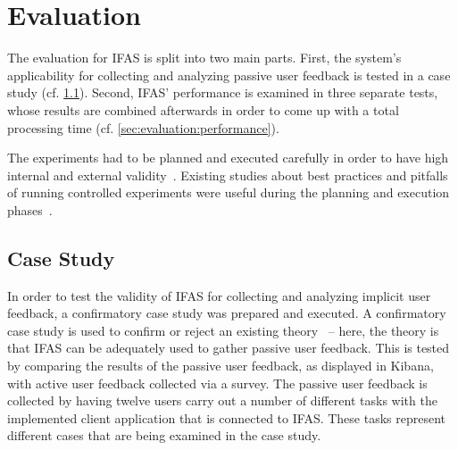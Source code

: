 %
\chapter{Evaluation}
\label{ch:evaluation}


The evaluation for \acf{IFAS} is split into two main parts.
First, the system's applicability for collecting and analyzing passive user feedback is tested in a case study (cf. \cref{sec:evaluation:user}).
Second, \ac{IFAS}' performance is examined in three separate tests, whose results are combined afterwards in order to come up with a total processing time (cf. \cref{sec:evaluation:performance}).


The experiments had to be planned and executed carefully in order to have high internal and external validity~\cite{Huitt2010}.
Existing studies about best practices and pitfalls of running controlled experiments were useful during the planning and execution phases~\cite{Kohavi2009}.


\section{Case Study}
\label{sec:evaluation:user}

In order to test the validity of \ac{IFAS} for collecting and analyzing implicit user feedback, a confirmatory case study was prepared and executed.
A confirmatory case study is used to confirm or reject an existing theory~\cite{Easterbrook2008} -- here, the theory is that \ac{IFAS} can be adequately used to gather passive user feedback.
This is tested by comparing the results of the passive user feedback, as displayed in Kibana, with active user feedback collected via a survey.
The passive user feedback is collected by having twelve users carry out a number of different tasks with the implemented client application that is connected to \ac{IFAS}.
These tasks represent different cases that are being examined in the case study.

